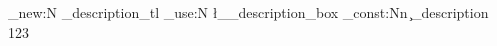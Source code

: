 \tl_new:N  %
  \g_description_tl
\box_use:N  %
  \l__description_box
\int_const:Nn  %
  \c_description
  { 123 }
